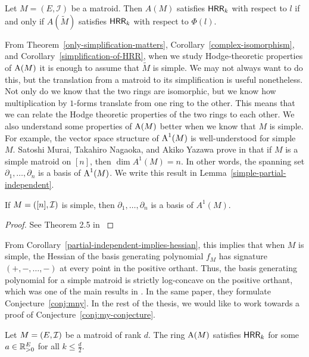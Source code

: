 \documentclass{puthesis-UG}
\begin{document}
\begin{cor} \label{simplification-of-HRR}
	Let $M = (E, \mathcal{I})$ be a matroid. Then $A(M)$ satisfies $\mathsf{HRR}_k$ with respect to $l$ if and only if $A(\widetilde{M})$ satisfies $\mathsf{HRR}_k$ with respect to $\Phi(l)$. 
\end{cor}

From Theorem~\ref{only-simplification-matters}, Corollary~\ref{complex-isomorphism}, and Corollary~\ref{simplification-of-HRR}, when we study Hodge-theoretic properties of $\operatorname{A}(M)$ it is enough to assume that $\widetilde{M}$ is simple. We may not always want to do this, but the translation from a matroid to its simplification is useful nonetheless. Not only do we know that the two rings are isomorphic, but we know how multiplication by $1$-forms translate from one ring to the other. This means that we can relate the Hodge theoretic properties of the two rings to each other. We also understand some properties of $\operatorname{A}(M)$ better when we know that $M$ is simple. For example, the vector space structure of $\operatorname{A}^1(M)$ is well-understood for simple $M$. Satoshi Murai, Takahiro Nagaoka, and Akiko Yazawa prove in \cite{MNY} that if $M$ is a simple matroid on $[n]$, then $\dim A^1(M) = n$. In other words, the spanning set $\partial_1, \ldots, \partial_n$ is a basis of $\operatorname{A}^1(M)$. We write this result in Lemma~\ref{simple-partial-independent}. 

\begin{lem} \label{simple-partial-independent}
	If $M = ([n], \mathcal{I})$ is simple, then $\partial_1, \ldots, \partial_n$ is a basis of $A^1(M)$.
\end{lem}

\begin{proof}
	See Theorem 2.5 in \cite{MNY}
\end{proof}	

From Corollary~\ref{partial-independent-implies-hessian}, this implies that when $M$ is simple, the Hessian of the basis generating polynomial $f_M$ has signature $(+,-, \ldots, -)$ at every point in the positive orthant. Thus, the basis generating polynomial for a simple matroid is strictly log-concave on the positive orthant, which was one of the main results in \cite{MNY}. In the same paper, they formulate Conjecture~\ref{conj:mny}. In the rest of the thesis, we would like to work towards a proof of Conjecture~\ref{conj:my-conjecture}. 

\begin{conj} \label{conj:mny}
	Let $M = (E, \mathcal{I})$ be a matroid of rank $d$. The ring $\operatorname{A}(M)$ satisfies $\mathsf{HRR}_k$ for some $a \in \mathbb{R}^E_{> 0}$ for all $k \leq \frac{d}{2}$.  
\end{conj}
\end{document}

